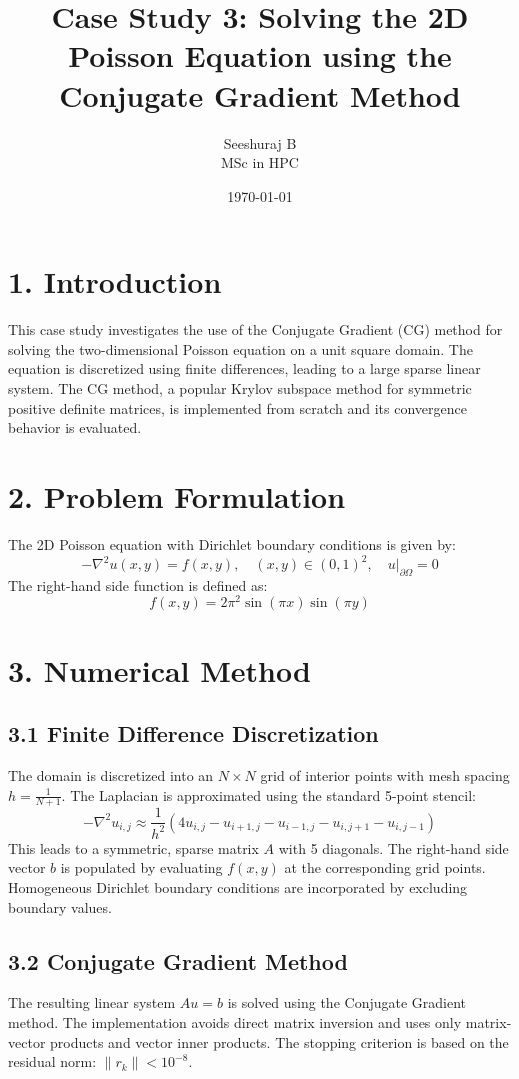 \documentclass[a4paper,12pt]{article}
\title{Case Study 3: Solving the 2D Poisson Equation using the Conjugate Gradient Method}
\author{Seeshuraj B \\ MSc in HPC}
\date{\today}
\begin{document}
\maketitle

\section*{1. Introduction}
This case study investigates the use of the Conjugate Gradient (CG) method for solving the two-dimensional Poisson equation on a unit square domain. The equation is discretized using finite differences, leading to a large sparse linear system. The CG method, a popular Krylov subspace method for symmetric positive definite matrices, is implemented from scratch and its convergence behavior is evaluated.

\section*{2. Problem Formulation}
The 2D Poisson equation with Dirichlet boundary conditions is given by:
\[
-\nabla^2 u(x,y) = f(x,y), \quad (x, y) \in (0,1)^2, \quad u|_{\partial \Omega} = 0
\]
The right-hand side function is defined as:
\[
f(x, y) = 2\pi^2 \sin(\pi x) \sin(\pi y)
\]

\section*{3. Numerical Method}
\subsection*{3.1 Finite Difference Discretization}
The domain is discretized into an \(N \times N\) grid of interior points with mesh spacing \(h = \frac{1}{N+1}\). The Laplacian is approximated using the standard 5-point stencil:
\[
-\nabla^2 u_{i,j} \approx \frac{1}{h^2}(4u_{i,j} - u_{i+1,j} - u_{i-1,j} - u_{i,j+1} - u_{i,j-1})
\]
This leads to a symmetric, sparse matrix \(A\) with 5 diagonals. The right-hand side vector \(b\) is populated by evaluating \(f(x, y)\) at the corresponding grid points. Homogeneous Dirichlet boundary conditions are incorporated by excluding boundary values.

\subsection*{3.2 Conjugate Gradient Method}
The resulting linear system \(Au = b\) is solved using the Conjugate Gradient method. The implementation avoids direct matrix inversion and uses only matrix-vector products and vector inner products. The stopping criterion is based on the residual norm: \(\|r_k\| < 10^{-8}\).
\end{document}
